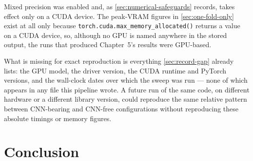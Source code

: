 Mixed precision was enabled and, as \autoref{sec:numerical-safeguards} records, takes effect only on a CUDA device. The peak-VRAM figures in \autoref{sec:one-fold-only} exist at all only because \verb|torch.cuda.max_memory_allocated()| returns a value on a CUDA device, so, although no GPU is named anywhere in the stored output, the runs that produced Chapter~5's results were GPU-based.

What is missing for exact reproduction is everything \autoref{sec:record-gap} already lists: the GPU model, the driver version, the CUDA runtime and PyTorch versions, and the wall-clock dates over which the sweep was run --- none of which appears in any file this pipeline wrote. A future run of the same code, on different hardware or a different library version, could reproduce the same relative pattern between CNN-bearing and CNN-free configurations without reproducing these absolute timings or memory figures.


\section{Conclusion}
\label{sec:ch4-conclusion}

